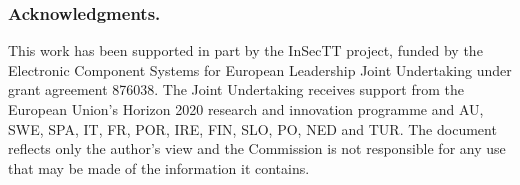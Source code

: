 \documentclass[runningheads]{llncs}
\begin{document}
\subsubsection{Acknowledgments.} This work has been supported in part by the InSecTT project, funded by the Electronic Component Systems for European Leadership Joint Undertaking under grant agreement 876038. The Joint Undertaking receives support from the European Union’s Horizon 2020 research and innovation programme and AU, SWE, SPA, IT, FR, POR, IRE, FIN, SLO, PO, NED and TUR. The document reflects only the author’s view and the Commission is not responsible for any use that may be made of the information it contains. 


\end{document}
